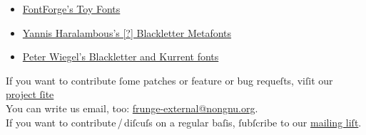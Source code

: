 \documentclass[
  ngerman,
  titlepage=no
]{scrartcl}
\begin{document}
\begin{itemize}
\item \href{http://fontforge.ſourceforge.net/sfds/toyfonts.html}{FontForge’s Toy
Fonts}
\item \href{http://www.ctan.org/tex-archive/fonts/gothic/yfrak/}{Yannis
Haralambous’s [?] Blackletter Metafonts}
\item \href{http://www.peter-wiegel.de/Fonts.html}{Peter Wiegel’s Blackletter and Kurrent fonts}
\end{itemize}

If you want to contribute ſome patches or feature or bug requeſts, viſit our
\href{http://ſv.nongnu.org/p/frunge}{project ſite}\\
\hypertarget{contact}{You can write us email, too:
\href{mailto:frunge-external@nongnu.org}{frunge-external@nongnu.org}}.\\
If you want to contribute\,/\,diſcuſs on a regular baſis, ſubſcribe to our
\href{http://liſts.nongnu.org/mailman/listinfo/frunge-internal}{mailing
liſt}.


\end{document}
